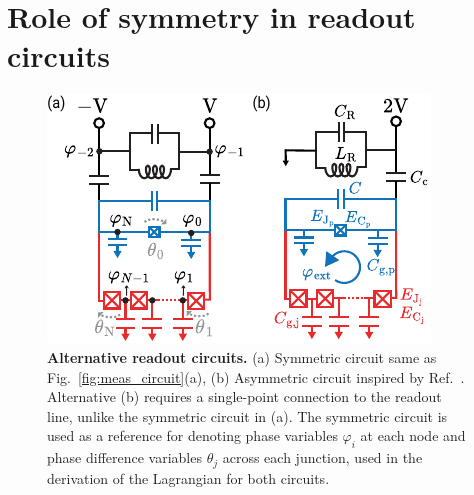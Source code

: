 \documentclass[%
reprint,
superscriptaddress,
 amsmath,amssymb,
 aps,
 prx,
longbibliography,
floatfix,
]{revtex4-2}
\begin{document}
\section{Role of symmetry in readout circuits}\label{app:alt_circuits}
\begin{figure}[htb]
    \centering
    \includegraphics[width=\linewidth]{Supp_Fig/Circuit_choice.pdf}
    \caption{{\bf Alternative readout circuits.} (a) Symmetric circuit same as Fig.~\ref{fig:meas_circuit}(a), (b) Asymmetric circuit inspired by Ref.~\cite{zhang_universal_2021}. Alternative (b) requires a single-point connection to the readout line, unlike the symmetric circuit in (a). The symmetric circuit is used as a reference for denoting phase variables $\varphi_i$ at each node and phase difference variables $\theta_j$ across each junction, used in the derivation of the Lagrangian for both circuits.}
    \label{fig:circuit_choice}
\end{figure}
\end{document}
